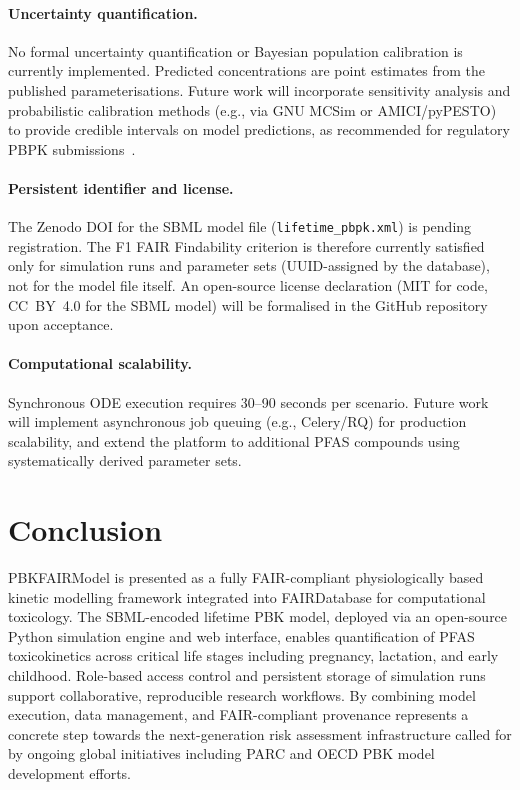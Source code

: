 \documentclass[preprint,12pt]{elsarticle}
\begin{document}
\begin{linenumbers}
\paragraph{Uncertainty quantification.}
No formal uncertainty quantification or Bayesian population calibration is currently implemented. Predicted concentrations are point estimates from the published parameterisations. Future work will incorporate sensitivity analysis and probabilistic calibration methods (e.g., via GNU MCSim or AMICI/pyPESTO) to provide credible intervals on model predictions, as recommended for regulatory PBPK submissions~\cite{OECD2021}.

\paragraph{Persistent identifier and license.}
The Zenodo DOI for the SBML model file (\texttt{lifetime\_pbpk.xml}) is pending registration. The F1 FAIR Findability criterion is therefore currently satisfied only for simulation runs and parameter sets (UUID-assigned by the database), not for the model file itself. An open-source license declaration (MIT for code, CC~BY~4.0 for the SBML model) will be formalised in the GitHub repository upon acceptance.

\paragraph{Computational scalability.}
Synchronous ODE execution requires 30--90 seconds per scenario. Future work will implement asynchronous job queuing (e.g., Celery/RQ) for production scalability, and extend the platform to additional PFAS compounds using systematically derived parameter sets.

\section{Conclusion}\label{sec5}


PBKFAIRModel is presented as a fully FAIR-compliant physiologically based
kinetic modelling framework integrated into FAIRDatabase for
computational toxicology. The SBML-encoded lifetime PBK model, deployed
via an open-source Python simulation engine and web interface, enables
quantification of PFAS toxicokinetics across critical
life stages including pregnancy, lactation, and early childhood.
Role-based access control and persistent storage of simulation runs
support collaborative, reproducible research workflows. By combining
model execution, data management, and FAIR-compliant provenance represents
a concrete step towards the next-generation risk assessment infrastructure
called for by ongoing global initiatives including PARC and OECD
PBK model development efforts.


\end{linenumbers}
\end{document}
